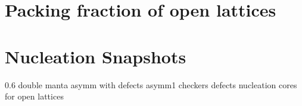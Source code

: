 \documentclass[a4paper,preprint]{revtex4}
\begin{document}
\section{Packing fraction of open lattices}

\section{Nucleation Snapshots}
0.6 double manta asymm with defects
asymm1 checkers defects
nucleation cores for open lattices 


\footnotesize{
 
 
}
\end{document}
